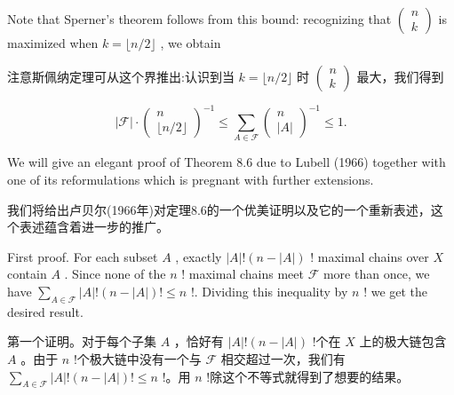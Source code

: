 \documentclass[10pt]{article}
\begin{document}
Note that Sperner’s theorem follows from this bound: recognizing that \(\left( \begin{array}{l} n \\  k \end{array}\right)\) is maximized when \(k = \lfloor n/2\rfloor\) , we obtain

\begin{tcolorbox}\relax
注意斯佩纳定理可从这个界推出:认识到当 \(k = \lfloor n/2\rfloor\) 时 \(\left( \begin{array}{l} n \\  k \end{array}\right)\) 最大，我们得到
\end{tcolorbox}

\[
\left| \mathcal{F}\right|  \cdot  {\left( \begin{matrix} n \\  \lfloor n/2\rfloor  \end{matrix}\right) }^{-1} \leq  \mathop{\sum }\limits_{{A \in  \mathcal{F}}}{\left( \begin{matrix} n \\  \left| A\right|  \end{matrix}\right) }^{-1} \leq  1.
\]

We will give an elegant proof of Theorem 8.6 due to Lubell (1966) together with one of its reformulations which is pregnant with further extensions.

\begin{tcolorbox}\relax
我们将给出卢贝尔(1966年)对定理8.6的一个优美证明以及它的一个重新表述，这个表述蕴含着进一步的推广。
\end{tcolorbox}

First proof. For each subset \(A\) , exactly \(\left| A\right| !\left( {n - \left| A\right| }\right)\) ! maximal chains over \(X\) contain \(A\) . Since none of the \(n\) ! maximal chains meet \(\mathcal{F}\) more than once, we have \(\mathop{\sum }\limits_{{A \in  \mathcal{F}}}\left| A\right| !\left( {n - \left| A\right| }\right) ! \leq  n\) !. Dividing this inequality by \(n\) ! we get the desired result.

\begin{tcolorbox}\relax
第一个证明。对于每个子集 \(A\) ，恰好有 \(\left| A\right| !\left( {n - \left| A\right| }\right)\) !个在 \(X\) 上的极大链包含 \(A\) 。由于 \(n\) !个极大链中没有一个与 \(\mathcal{F}\) 相交超过一次，我们有 \(\mathop{\sum }\limits_{{A \in  \mathcal{F}}}\left| A\right| !\left( {n - \left| A\right| }\right) ! \leq  n\) !。用 \(n\) !除这个不等式就得到了想要的结果。
\end{tcolorbox}
\end{document}

